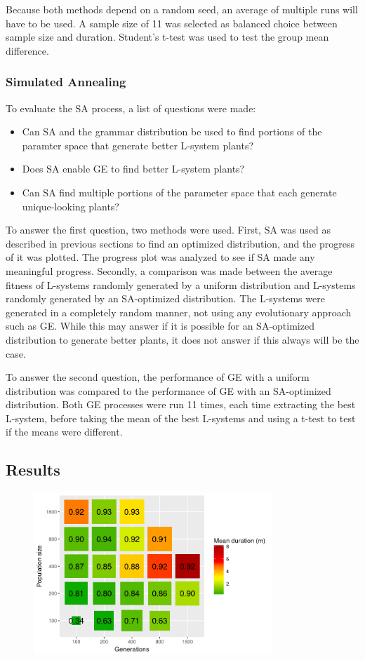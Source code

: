 Because both methods depend on a random seed, an average of multiple runs will have to be used.
A sample size of 11 was selected as balanced choice between sample size and duration.
Student's t-test was used to test the group mean difference.

\subsubsection{Simulated Annealing}
To evaluate the SA process, a list of questions were made:
\begin{itemize}
	\item Can SA and the grammar distribution be used to find portions of the paramter space that generate better L-system plants?
	\item Does SA enable GE to find better L-system plants?
	\item Can SA find multiple portions of the parameter space that each generate unique-looking plants?
\end{itemize}
To answer the first question, two methods were used.
First, SA was used as described in previous sections to find an optimized distribution, and the progress of it was plotted.
The progress plot was analyzed to see if SA made any meaningful progress.
Secondly, a comparison was made between the average fitness of L-systems randomly generated by a uniform distribution and L-systems randomly generated by an SA-optimized distribution.
The L-systems were generated in a completely random manner, not using any evolutionary approach such as GE.
While this may answer if it is possible for an SA-optimized distribution to generate better plants, it does not answer if this always will be the case.

To answer the second question, the performance of GE with a uniform distribution was compared to the performance of GE with an SA-optimized distribution.
Both GE processes were run 11 times, each time extracting the best L-system, before taking the mean of the best L-systems and using a t-test to test if the means were different.

\subsection{Results}
\begin{figure}
    \centering
    \includegraphics[width=0.8\textwidth]{figures/ge-size-sampling}
    \caption{}
\end{figure}

